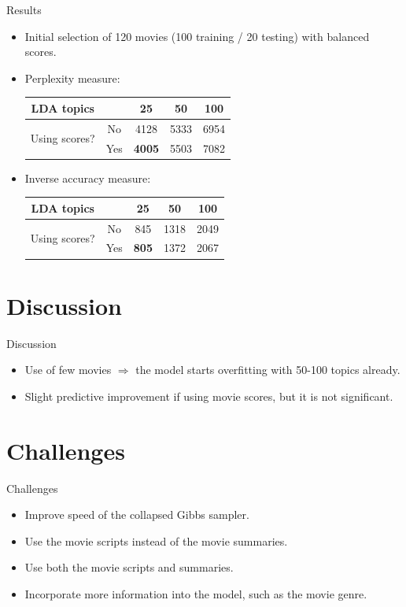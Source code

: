 \documentclass{beamer}
\begin{document}
\begin{frame}{Results}
	\begin{itemize}
	\item Initial selection of 120 movies (100 training / 20 testing) with balanced scores.
	\item Perplexity measure:
	
	\begin{center}
	\begin{tabular}{cc|ccc}
		LDA topics      & & 25 & 50 & 100 \\ \hline
		\multirow{2}{*}{Using scores?} & No  & 4128 & 5333 & 6954 \\
		                               & Yes & \textbf{4005} & 5503 & 7082 \\
	\end{tabular}
	\end{center}
	
	\item Inverse accuracy measure:
	
	\begin{center}
	\begin{tabular}{cc|ccc}
		LDA topics      & & 25 & 50 & 100 \\ \hline
		\multirow{2}{*}{Using scores?} & No  & 845 & 1318 & 2049 \\
		                               & Yes & \textbf{805} & 1372 & 2067 \\
	\end{tabular}
	\end{center}
	\end{itemize}
\end{frame}

\section{Discussion}

\begin{frame}{Discussion}
	\begin{itemize}
	\item Use of few movies $\Rightarrow$ the model starts overfitting with 50-100 topics already.
	\item Slight predictive improvement if using movie scores, but it is not significant.
	\end{itemize}
\end{frame}

\section{Challenges}

\begin{frame}{Challenges}
	\begin{itemize}
	\item Improve speed of the collapsed Gibbs sampler.
	\item Use the movie scripts instead of the movie summaries.
	\item Use both the movie scripts and summaries.
	\item Incorporate more information into the model, such as the movie genre.
	\end{itemize}
\end{frame}
\end{document}
